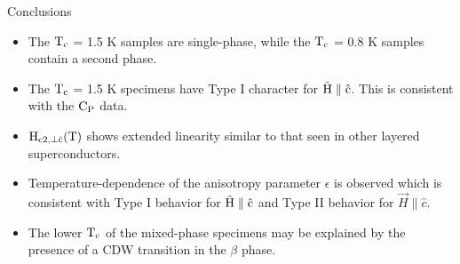 
\begin{Large}
\begin{center}
Conclusions
\end{center}
\end{Large}
\vspace{1in}
\begin{large}
\begin{itemize}
\item The $\rm T_c$ = 1.5 K samples are single-phase, while the $\rm T_c$ =
0.8 K samples contain a second phase.
\bigskip
\item The $\rm T_c$ = 1.5 K specimens have Type I character for $\rm
\vec{H} \parallel \hat{c}$.  This is consistent with the $\rm C_P$ data.
\bigskip
\item $\rm H_{c2, \perp \hat{c}}(T)$ shows extended linearity similar to
that seen in other layered superconductors.
\bigskip
\item Temperature-dependence of the anisotropy parameter $\epsilon$ is
observed which is consistent with Type I behavior for $\rm \vec{H}
\parallel \hat{c}$ and Type II behavior for $\vec{H} \parallel \hat{c}$.
\bigskip
\item The lower $\rm T_c$ of the mixed-phase specimens may be explained by
the presence of a CDW transition in the $\beta$ phase.
\end{itemize}
\end{large}

